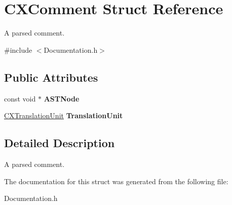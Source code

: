 \hypertarget{structCXComment}{}\section{C\+X\+Comment Struct Reference}
\label{structCXComment}


A parsed comment.  




{\ttfamily \#include $<$Documentation.\+h$>$}

\subsection*{Public Attributes}
\begin{DoxyCompactItemize}
\item 
\mbox{\label{structCXComment_a0f56ce2a03f4e8bd97136a1e74a822e5}} 
const void $\ast$ {\bfseries A\+S\+T\+Node}
\item 
\mbox{\label{structCXComment_a685e6ba020c81779ef2811141a8e345b}} 
\mbox{\hyperlink{group__CINDEX_gacdb7815736ca709ce9a5e1ec2b7e16ac}{C\+X\+Translation\+Unit}} {\bfseries Translation\+Unit}
\end{DoxyCompactItemize}


\subsection{Detailed Description}
A parsed comment. 

The documentation for this struct was generated from the following file\+:\begin{DoxyCompactItemize}
\item 
Documentation.\+h\end{DoxyCompactItemize}
